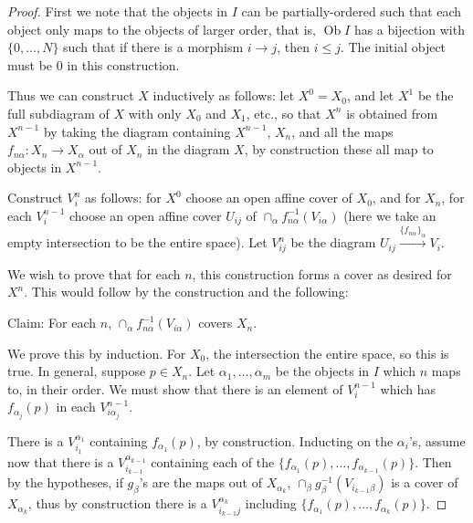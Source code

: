 \documentclass{report}
\theoremstyle{definition}
\DeclareMathOperator{\Ob}{Ob}
\begin{document}
\begin{proof}
	First we note that the objects in $I$ can be partially-ordered such that each object only maps to the objects of larger order, that is, $\Ob I$ has a bijection with $\{0, \dots, N\}$ such that if there is a morphism $i \rightarrow j$, then $i \leq j$.
	The initial object must be 0 in this construction.
	
	Thus we can construct $X$ inductively as follows: let $X^0 = X_0$, and let $X^1$ be the full subdiagram of $X$ with only $X_0$ and $X_1$, etc., so that $X^n$ is obtained from $X^{n-1}$ by taking the diagram containing $X^{n-1}$, $X_n$, and all the maps $f_{n\alpha}:X_n \rightarrow X_\alpha$ out of $X_n$ in the diagram $X$, by construction these all map to objects in $X^{n-1}$.
	
	Construct $V_i^n$ as follows: for $X^0$ choose an open affine cover of $X_0$, and for $X_n$, for each $V_i^{n-1}$ choose an open affine cover $U_{ij}$ of $\cap_\alpha f_{n\alpha}^{-1}(V_{i\alpha})$ (here we take an empty intersection to be the entire space).
	Let $V_{ij}^n$ be the diagram $U_{ij} \xrightarrow{\{f_{n\alpha}\}_\alpha} V_i$.
	
	We wish to prove that for each $n$, this construction forms a cover as desired for $X^n$.
	This would follow by the construction and the following:
	
	Claim: For each $n$, $\cap_\alpha f_{n\alpha}^{-1}(V_{i\alpha})$ covers $X_n$.
	
	We prove this by induction.
	For $X_0$, the intersection the entire space, so this is true.
	In general, suppose $p \in X_n$.
	Let $\alpha_1, \dots, \alpha_m$ be the objects in $I$ which $n$ maps to, in their order.
	We must show that there is an element of $V_i^{n-1}$ which has $f_{\alpha_j}(p)$ in each $V_{i \alpha_j}^{n-1}$.
	
	There is a $V_{i_1}^{\alpha_1}$ containing $f_{\alpha_1}(p)$, by construction.
	Inducting on the $\alpha_i$'s, assume now that there is a $V_{i_{k-1}}^{\alpha_{k-1}}$ containing each of the $\{f_{\alpha_1}(p), \dots, f_{\alpha_{k-1}}(p)\}$.
	Then by the hypotheses, if $g_\beta$'s are the maps out of $X_{\alpha_k}$, $\cap_\beta g_{\beta}^{-1}(V_{i_{k-1}\beta})$ is a cover of $X_{\alpha_k}$, thus by construction there is a $V_{i_{k-1}j}^{\alpha_k}$ including $\{f_{\alpha_1}(p), \dots, f_{\alpha_{k}}(p)\}$.
\end{proof}
\end{document}
